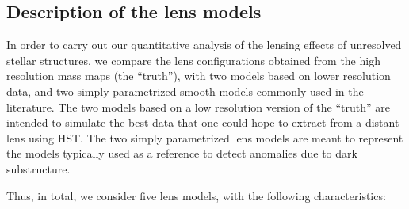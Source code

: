\subsection{Description of the lens models}
\label{ssec:models}

In order to carry out our quantitative analysis of the lensing effects of unresolved stellar structures, we compare the lens configurations obtained from the high resolution mass maps (the ``truth''), with two models based on lower resolution data, and two simply parametrized smooth models commonly used in the literature. The two models based on a low resolution version of the ``truth'' are intended to simulate the best data that one could hope to extract from a distant lens using HST. The two simply parametrized lens models are meant to represent the models typically used as a reference to detect anomalies due to dark substructure.

Thus, in total, we consider five lens models, with the following
characteristics:

